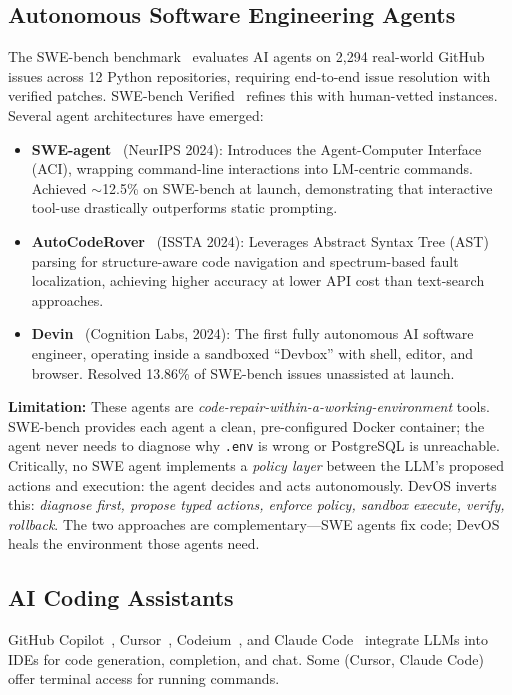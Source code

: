 \documentclass[conference,10pt,caption=false]{IEEEtran}
\begin{document}
\subsection{Autonomous Software Engineering Agents}
\label{sec:swe-agents}
The SWE-bench benchmark~\cite{swe-bench} evaluates AI agents on 2,294 real-world GitHub issues across 12 Python repositories, requiring end-to-end issue resolution with verified patches. SWE-bench Verified~\cite{swebench-verified} refines this with human-vetted instances. Several agent architectures have emerged:

\begin{itemize}[leftmargin=*, nosep]
    \item \textbf{SWE-agent}~\cite{swe-agent} (NeurIPS 2024): Introduces the Agent-Computer Interface (ACI), wrapping command-line interactions into LM-centric commands. Achieved $\sim$12.5\% on SWE-bench at launch, demonstrating that interactive tool-use drastically outperforms static prompting.
    \item \textbf{AutoCodeRover}~\cite{autocoderover} (ISSTA 2024): Leverages Abstract Syntax Tree (AST) parsing for structure-aware code navigation and spectrum-based fault localization, achieving higher accuracy at lower API cost than text-search approaches.
    \item \textbf{Devin}~\cite{devin} (Cognition Labs, 2024): The first fully autonomous AI software engineer, operating inside a sandboxed ``Devbox'' with shell, editor, and browser. Resolved 13.86\% of SWE-bench issues unassisted at launch.
\end{itemize}

\textbf{Limitation:} These agents are \textit{code-repair-within-a-working-environment} tools. SWE-bench provides each agent a clean, pre-configured Docker container; the agent never needs to diagnose why \texttt{.env} is wrong or PostgreSQL is unreachable. Critically, no SWE agent implements a \textit{policy layer} between the LLM's proposed actions and execution: the agent decides and acts autonomously. DevOS inverts this: \textit{diagnose first, propose typed actions, enforce policy, sandbox execute, verify, rollback}. The two approaches are complementary---SWE agents fix code; DevOS heals the environment those agents need.

\subsection{AI Coding Assistants}
\label{sec:ai-coding}
GitHub Copilot~\cite{copilot}, Cursor~\cite{cursor}, Codeium~\cite{codeium}, and Claude Code~\cite{claude-code} integrate LLMs into IDEs for code generation, completion, and chat. Some (Cursor, Claude Code) offer terminal access for running commands.
\end{document}
